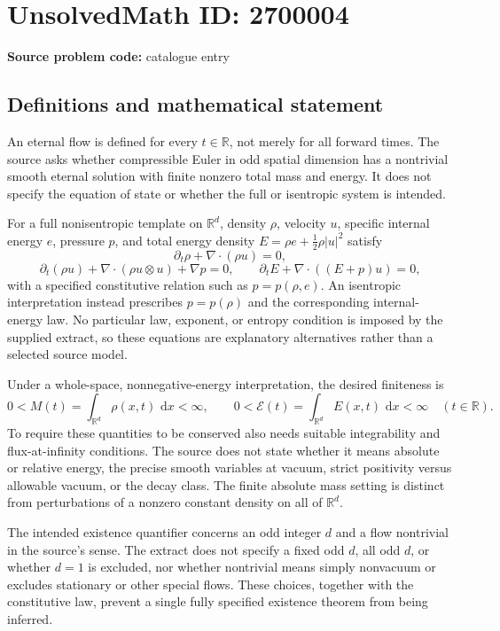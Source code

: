 \documentclass[11pt]{article}
\newcommand{\R}{\mathbb{R}}
\newcommand{\dd}{\,\mathrm{d}}
\begin{document}
\section*{UnsolvedMath ID: 2700004}
\textbf{Source problem code:} catalogue entry
\subsection{Definitions and mathematical statement}
An eternal flow is defined for every $t\in\R$, not merely for all forward times. The source asks whether compressible Euler in odd spatial dimension has a nontrivial smooth eternal solution with finite nonzero total mass and energy. It does not specify the equation of state or whether the full or isentropic system is intended.

For a full nonisentropic template on $\R^d$, density $\rho$, velocity $u$, specific internal energy $e$, pressure $p$, and total energy density $E=\rho e+\tfrac12\rho|u|^2$ satisfy
\[
\partial_t\rho+\nabla\cdot(\rho u)=0,
\]
\[
\partial_t(\rho u)+\nabla\cdot(\rho u\otimes u)+\nabla p=0,
\qquad
\partial_tE+\nabla\cdot((E+p)u)=0,
\]
with a specified constitutive relation such as $p=p(\rho,e)$. An isentropic interpretation instead prescribes $p=p(\rho)$ and the corresponding internal-energy law. No particular law, exponent, or entropy condition is imposed by the supplied extract, so these equations are explanatory alternatives rather than a selected source model.

Under a whole-space, nonnegative-energy interpretation, the desired finiteness is
\[
0<M(t)=\int_{\R^d}\rho(x,t)\,\dd x<\infty,
\qquad
0<\mathcal E(t)=\int_{\R^d}E(x,t)\,\dd x<\infty
\quad(t\in\R).
\]
To require these quantities to be conserved also needs suitable integrability and flux-at-infinity conditions. The source does not state whether it means absolute or relative energy, the precise smooth variables at vacuum, strict positivity versus allowable vacuum, or the decay class. The finite absolute mass setting is distinct from perturbations of a nonzero constant density on all of $\R^d$.

The intended existence quantifier concerns an odd integer $d$ and a flow nontrivial in the source's sense. The extract does not specify a fixed odd $d$, all odd $d$, or whether $d=1$ is excluded, nor whether nontrivial means simply nonvacuum or excludes stationary or other special flows. These choices, together with the constitutive law, prevent a single fully specified existence theorem from being inferred.
\end{document}
